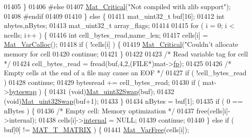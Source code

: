 \begin{DoxyCode}
{{{{{{{{{01405         \}
01406 \textcolor{preprocessor}{#else}
01407         \hyperlink{group__mat__util_gaf51f2bfbb5580f575e4dd79757e2b80c}{Mat\_Critical}(\textcolor{stringliteral}{"Not compiled with zlib support"});
01408 \textcolor{preprocessor}{#endif}
01409 
01410     \} \textcolor{keywordflow}{else} \{
01411         mat\_uint32\_t buf[16];
01412         \textcolor{keywordtype}{int} nbytes,nBytes;
01413         mat\_uint32\_t array\_flags;
01414 
01415         \textcolor{keywordflow}{for} ( i = 0; i < ncells; i++ ) \{
01416             \textcolor{keywordtype}{int} cell\_bytes\_read,name\_len;
01417             cells[i] = \hyperlink{group___m_a_t_gae7c9c3699f6e9c31a9c490300013098c}{Mat\_VarCalloc}();
01418             \textcolor{keywordflow}{if} ( !cells[i] ) \{
01419                 \hyperlink{group__mat__util_gaf51f2bfbb5580f575e4dd79757e2b80c}{Mat\_Critical}(\textcolor{stringliteral}{"Couldn't allocate memory for cell %
01420                 \textcolor{keywordflow}{continue};
01421             \}
01422 
01423             \textcolor{comment}{/* Read variable tag for cell */}
01424             cell\_bytes\_read = fread(buf,4,2,(FILE*)mat->\hyperlink{struct__mat__t_a85f562e407ca9ad4d2a6e14f839432b7}{fp});
01425 
01426             \textcolor{comment}{/* Empty cells at the end of a file may cause an EOF */}
01427             \textcolor{keywordflow}{if} ( !cell\_bytes\_read )
01428                 \textcolor{keywordflow}{continue};
01429             bytesread += cell\_bytes\_read;
01430             \textcolor{keywordflow}{if} ( mat->\hyperlink{struct__mat__t_a99d207977af5e04941ace56d71817a40}{byteswap} ) \{
01431                 (void)\hyperlink{endian_8c_a8cb0d0750e2eaf9840d95db531934f4f}{Mat\_uint32Swap}(buf);
01432                 (void)\hyperlink{endian_8c_a8cb0d0750e2eaf9840d95db531934f4f}{Mat\_uint32Swap}(buf+1);
01433             \}
01434             nBytes = buf[1];
01435             \textcolor{keywordflow}{if} ( 0 == nBytes ) \{
01436                 \textcolor{comment}{/* Empty cell: Memory optimization */}
01437                 free(cells[i]->\textcolor{keyword}{internal});
01438                 cells[i]->\hyperlink{group___m_a_t_a6e97e3ed9f40c49322c18561c2a94e92}{internal} = NULL;
01439                 \textcolor{keywordflow}{continue};
01440             \} \textcolor{keywordflow}{else} \textcolor{keywordflow}{if} ( buf[0] != \hyperlink{group___m_a_t_ggacf7b3b879282b7ab3a51190e49bf3453a32985fee89a4df8db4b3f5d3a48823d3}{MAT\_T\_MATRIX} ) \{
01441                 \hyperlink{group___m_a_t_ga1d14716f7450530fd1c9d02413787f0e}{Mat\_VarFree}(cells[i]);
}}}}}}}}}}
\end{DoxyCode}

